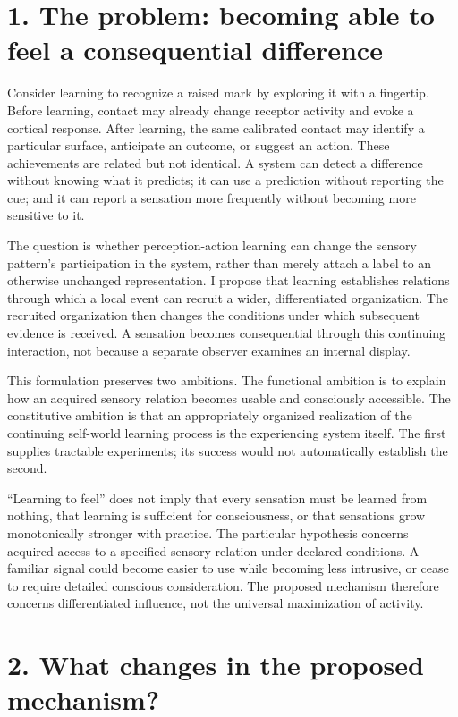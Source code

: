 \documentclass[
  american,
  11pt,
  letterpaper,
]{article}
\begin{document}
\section{1. The problem: becoming able to feel a consequential difference}\label{the-problem-becoming-able-to-feel-a-consequential-difference}

Consider learning to recognize a raised mark by exploring it with a fingertip. Before learning, contact may already change receptor activity and evoke a cortical response. After learning, the same calibrated contact may identify a particular surface, anticipate an outcome, or suggest an action. These achievements are related but not identical. A system can detect a difference without knowing what it predicts; it can use a prediction without reporting the cue; and it can report a sensation more frequently without becoming more sensitive to it.

The question is whether perception-action learning can change the sensory pattern's participation in the system, rather than merely attach a label to an otherwise unchanged representation. I propose that learning establishes relations through which a local event can recruit a wider, differentiated organization. The recruited organization then changes the conditions under which subsequent evidence is received. A sensation becomes consequential through this continuing interaction, not because a separate observer examines an internal display.

This formulation preserves two ambitions. The functional ambition is to explain how an acquired sensory relation becomes usable and consciously accessible. The constitutive ambition is that an appropriately organized realization of the continuing self-world learning process is the experiencing system itself. The first supplies tractable experiments; its success would not automatically establish the second.

``Learning to feel'' does not imply that every sensation must be learned from nothing, that learning is sufficient for consciousness, or that sensations grow monotonically stronger with practice. The particular hypothesis concerns acquired access to a specified sensory relation under declared conditions. A familiar signal could become easier to use while becoming less intrusive, or cease to require detailed conscious consideration. The proposed mechanism therefore concerns differentiated influence, not the universal maximization of activity.

\section{2. What changes in the proposed mechanism?}\label{what-changes-in-the-proposed-mechanism}
\end{document}
